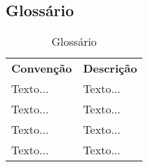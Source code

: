 

\subsection{Glossário} %

\begin{table}[h]
    \centering
    {\renewcommand\arraystretch{1.25}
       \caption{Glossário}
       \vspace{0.3cm}
 \begin{tabular}{ l l }
         \cline{1-1}\cline{2-2}  
         \multicolumn{1}{|p{3.850cm}|}{\textbf{Convenção} \centering } &
         \multicolumn{1}{p{8cm}|}{\textbf{Descrição} \centering }
           \\  
           \cline{1-1}\cline{2-2}  
          \multicolumn{1}{|p{3.850cm}|}{\vspace{0.3cm} Texto... \centering } &
           \multicolumn{1}{p{8cm}|}{Texto... \centering }
             \\  
             \cline{1-1}\cline{2-2}  
             \multicolumn{1}{|p{3.850cm}|}{\vspace{0.4cm} Texto... \centering } &
             \multicolumn{1}{p{8cm}|}{Texto... \centering }
               \\  
               \cline{1-1}\cline{2-2}  
               \multicolumn{1}{|p{3.850cm}|}{\vspace{0.1cm} Texto... \centering } &
               \multicolumn{1}{p{8cm}|}{Texto... \centering } 
              \\
               \cline{1-1}\cline{2-2}
               \multicolumn{1}{|p{3.850cm}|}{\vspace{0.1cm} Texto... \centering } & 
               \multicolumn{1}{p{8cm}|}{Texto... \centering }
                \\
                   \hline
                   
               \end{tabular}  }
                   \end{table}

\label{sub:glossário}

